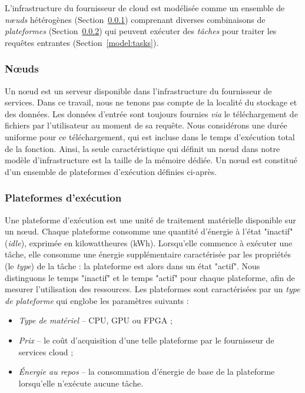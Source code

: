 L'infrastructure du fournisseur de cloud est modélisée comme un ensemble de \textit{nœuds} hétérogènes (Section~\ref{model:nodes}) comprenant diverses combinaisons de \textit{plateformes} (Section~\ref{model:platforms}) qui peuvent exécuter des \textit{tâches} pour traiter les requêtes entrantes (Section~\ref{model:tasks}).

\subsubsection{Nœuds}
\label{model:nodes}

Un nœud est un serveur disponible dans l'infrastructure du fournisseur de services. Dans ce travail, nous ne tenons pas compte de la localité du stockage et des données. Les données d'entrée sont toujours fournies \textit{via} le téléchargement de fichiers par l'utilisateur au moment de sa requête. Nous considérons une durée uniforme pour ce téléchargement, qui est incluse dans le temps d'exécution total de la fonction. Ainsi, la seule caractéristique qui définit un nœud dans notre modèle d'infrastructure est la taille de la mémoire dédiée. Un nœud est constitué d'un ensemble de plateformes d'exécution définies ci-après.

\subsubsection{Plateformes d'exécution}
\label{model:platforms}

Une plateforme d'exécution est une unité de traitement matérielle disponible sur un nœud. Chaque plateforme consomme une quantité d'énergie à l'état "inactif" (\textit{idle}), exprimée en kilowattheures (kWh). Lorsqu'elle commence à exécuter une tâche, elle consomme une énergie supplémentaire caractérisée par les propriétés (le \textit{type}) de la tâche : la plateforme est alors dans un état "actif". Nous distinguons le temps "inactif" et le temps "actif" pour chaque plateforme, afin de mesurer l'utilisation des ressources. Les plateformes sont caractérisées par un \textit{type de plateforme} qui englobe les paramètres suivants :

\begin{itemize}
    \item \textit{Type de matériel} -- CPU, GPU ou FPGA ;
    \item \textit{Prix} -- le coût d'acquisition d'une telle plateforme par le fournisseur de services cloud ;
    \item \textit{Énergie au repos} -- la consommation d'énergie de base de la plateforme lorsqu'elle n'exécute aucune tâche.
\end{itemize}


